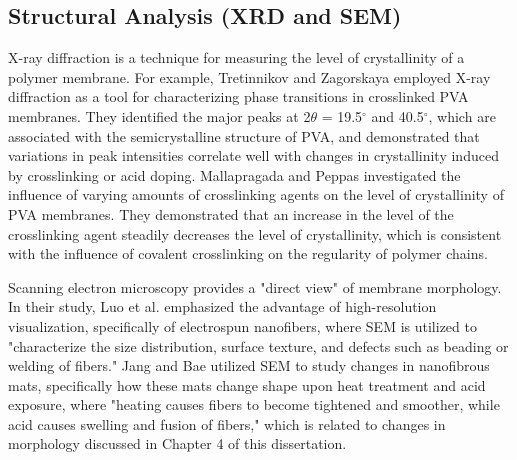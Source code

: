 \documentclass[12pt,a4paper]{report}
\begin{document}
\subsection{Structural Analysis (XRD and SEM)}
X-ray diffraction is a technique for measuring the level of crystallinity of a polymer membrane. For example, Tretinnikov and Zagorskaya employed X-ray diffraction as a tool for characterizing phase transitions in crosslinked PVA membranes. They identified the major peaks at 2\(\theta\) = 19.5\(^\circ\) and 40.5\(^\circ\), which are associated with the semicrystalline structure of PVA, and demonstrated that variations in peak intensities correlate well with changes in crystallinity induced by crosslinking or acid doping. \cite{33} Mallapragada and Peppas investigated the influence of varying amounts of crosslinking agents on the level of crystallinity of PVA membranes. They demonstrated that an increase in the level of the crosslinking agent steadily decreases the level of crystallinity, which is consistent with the influence of covalent crosslinking on the regularity of polymer chains.\cite{31}

Scanning electron microscopy provides a "direct view" of membrane morphology. In their study, Luo et al. emphasized the advantage of high-resolution visualization, specifically of electrospun nanofibers, where SEM is utilized to "characterize the size distribution, surface texture, and defects such as beading or welding of fibers.\cite{39}" Jang and Bae utilized SEM to study changes in nanofibrous mats, specifically how these mats change shape upon heat treatment and acid exposure, where "heating causes fibers to become tightened and smoother, while acid causes swelling and fusion of fibers," which is related to changes in morphology discussed in Chapter 4 of this dissertation.\cite{35}
\end{document}
